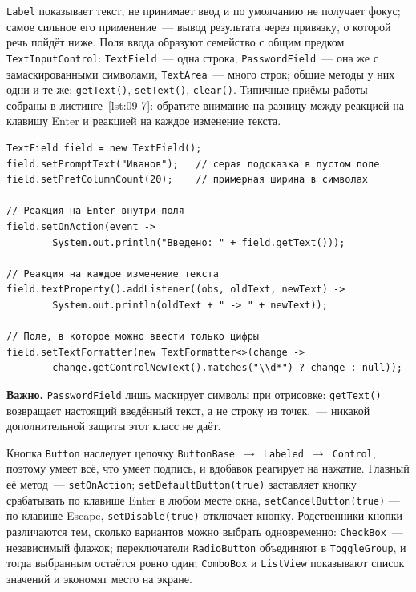 \texttt{Label} показывает текст, не принимает ввод и по умолчанию не получает
фокус; самое сильное его применение~--- вывод результата через привязку, о
которой речь пойдёт ниже. Поля ввода образуют семейство с общим предком
\texttt{TextInputControl}: \texttt{TextField}~--- одна строка,
\texttt{PasswordField}~--- она же с замаскированными символами,
\texttt{TextArea}~--- много строк; общие методы у них одни и те же:
\texttt{getText()}, \texttt{setText()}, \texttt{clear()}. Типичные приёмы работы
собраны в листинге~\ref{lst:09-7}: обратите внимание на разницу между реакцией
на клавишу Enter и реакцией на каждое изменение текста.

\begin{listing}[H]
\begin{verbatim}
TextField field = new TextField();
field.setPromptText("Иванов");   // серая подсказка в пустом поле
field.setPrefColumnCount(20);    // примерная ширина в символах

// Реакция на Enter внутри поля
field.setOnAction(event ->
        System.out.println("Введено: " + field.getText()));

// Реакция на каждое изменение текста
field.textProperty().addListener((obs, oldText, newText) ->
        System.out.println(oldText + " -> " + newText));

// Поле, в которое можно ввести только цифры
field.setTextFormatter(new TextFormatter<>(change ->
        change.getControlNewText().matches("\\d*") ? change : null));
\end{verbatim}
\caption{Поля ввода и реакция на изменение текста}
\label{lst:09-7}
\end{listing}

\begin{vrezka}
\textbf{Важно.} \texttt{PasswordField} лишь маскирует символы при отрисовке:
\texttt{getText()} возвращает настоящий введённый текст, а не строку из
точек,~--- никакой дополнительной защиты этот класс не даёт.
\end{vrezka}

Кнопка \texttt{Button} наследует цепочку
\texttt{ButtonBase}~$\to$~\texttt{Labeled}~$\to$~\texttt{Control}, поэтому умеет
всё, что умеет подпись, и вдобавок реагирует на нажатие. Главный её метод~---
\texttt{setOnAction}; \texttt{setDefaultButton(true)} заставляет кнопку
срабатывать по клавише Enter в любом месте окна, \texttt{setCancelButton(true)}
--- по клавише Escape, \texttt{setDisable(true)} отключает кнопку. Родственники
кнопки различаются тем, сколько вариантов можно выбрать одновременно:
\texttt{CheckBox}~--- независимый флажок; переключатели \texttt{RadioButton}
объединяют в \texttt{ToggleGroup}, и тогда выбранным остаётся ровно один;
\texttt{ComboBox} и \texttt{ListView} показывают список значений и экономят
место на экране.

